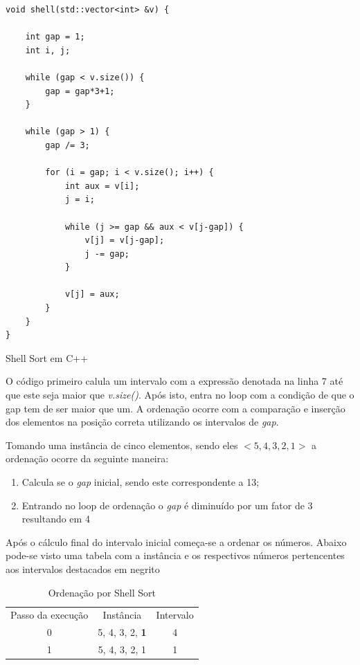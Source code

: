 \documentclass[a4paper, 12pt]{report}
\begin{document}
\begin{listing}[H]
\begin{verbatim}
void shell(std::vector<int> &v) {

    int gap = 1;
    int i, j;

    while (gap < v.size()) {
        gap = gap*3+1;
    }

    while (gap > 1) {
        gap /= 3;

        for (i = gap; i < v.size(); i++) {
            int aux = v[i];
            j = i;

            while (j >= gap && aux < v[j-gap]) {
                v[j] = v[j-gap];
                j -= gap;
            }

            v[j] = aux;
        }
    }
}
\end{verbatim}
\caption{Shell Sort em C++}
\end{listing}

O código primeiro calula um intervalo com a expressão denotada na linha 7 até
que este seja maior que \emph{v.size()}. Após isto, entra no loop com a condição
de que o gap tem de ser maior que um. A ordenação ocorre com a comparação e
inserção dos elementos na posição correta utilizando os intervalos de \emph{gap}.

Tomando uma instância de cinco elementos, sendo eles $<5, 4, 3, 2, 1>$ a
ordenação ocorre da seguinte maneira:

\begin{enumerate}
\item Calcula se o \emph{gap} inicial, sendo este correspondente a 13;
\item Entrando no loop de ordenação o \emph{gap} é diminuído por um fator de 3 resultando em 4
\end{enumerate}

Após o cálculo final do intervalo inicial começa-se a ordenar os números.
Abaixo pode-se visto uma tabela com a instância e os respectivos números
pertencentes aos intervalos destacados em negrito

\begin{table}[htb]
\caption{Ordenação por Shell Sort}
\centering
\begin{tabular}{ccc}
Passo da execução & Instância & Intervalo\\
0 & 5, 4, 3, 2, \textbf{1} & 4\\
1 & 5, 4, 3, 2, 1 & 1\\
\end{tabular}
\end{table}
\end{document}
